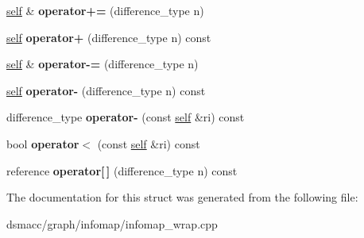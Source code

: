 \begin{DoxyCompactItemize}
\item 
\mbox{\label{structswig_1_1SwigPySequence__InputIterator_abff285d61554d58f95218ed8b58fb2e8}} 
\mbox{\hyperlink{structswig_1_1SwigPySequence__InputIterator}{self}} \& {\bfseries operator+=} (difference\+\_\+type n)
\item 
\mbox{\label{structswig_1_1SwigPySequence__InputIterator_ac9944e0170aff64c4a54eb0156e89839}} 
\mbox{\hyperlink{structswig_1_1SwigPySequence__InputIterator}{self}} {\bfseries operator+} (difference\+\_\+type n) const
\item 
\mbox{\label{structswig_1_1SwigPySequence__InputIterator_a2156567b8085288817b8f2ed9a13500e}} 
\mbox{\hyperlink{structswig_1_1SwigPySequence__InputIterator}{self}} \& {\bfseries operator-\/=} (difference\+\_\+type n)
\item 
\mbox{\label{structswig_1_1SwigPySequence__InputIterator_aef6a178c9d3379f989dd5b1f03e744bf}} 
\mbox{\hyperlink{structswig_1_1SwigPySequence__InputIterator}{self}} {\bfseries operator-\/} (difference\+\_\+type n) const
\item 
\mbox{\label{structswig_1_1SwigPySequence__InputIterator_a7261ec6cb32a1740e0e2836e2ce31495}} 
difference\+\_\+type {\bfseries operator-\/} (const \mbox{\hyperlink{structswig_1_1SwigPySequence__InputIterator}{self}} \&ri) const
\item 
\mbox{\label{structswig_1_1SwigPySequence__InputIterator_aa86abc679e1f39a48692704314f4ce21}} 
bool {\bfseries operator$<$} (const \mbox{\hyperlink{structswig_1_1SwigPySequence__InputIterator}{self}} \&ri) const
\item 
\mbox{\label{structswig_1_1SwigPySequence__InputIterator_aac69219ece9efef26c9a171a6952ee94}} 
reference {\bfseries operator\mbox{[}$\,$\mbox{]}} (difference\+\_\+type n) const
\end{DoxyCompactItemize}


The documentation for this struct was generated from the following file\+:\begin{DoxyCompactItemize}
\item 
dsmacc/graph/infomap/infomap\+\_\+wrap.\+cpp\end{DoxyCompactItemize}
